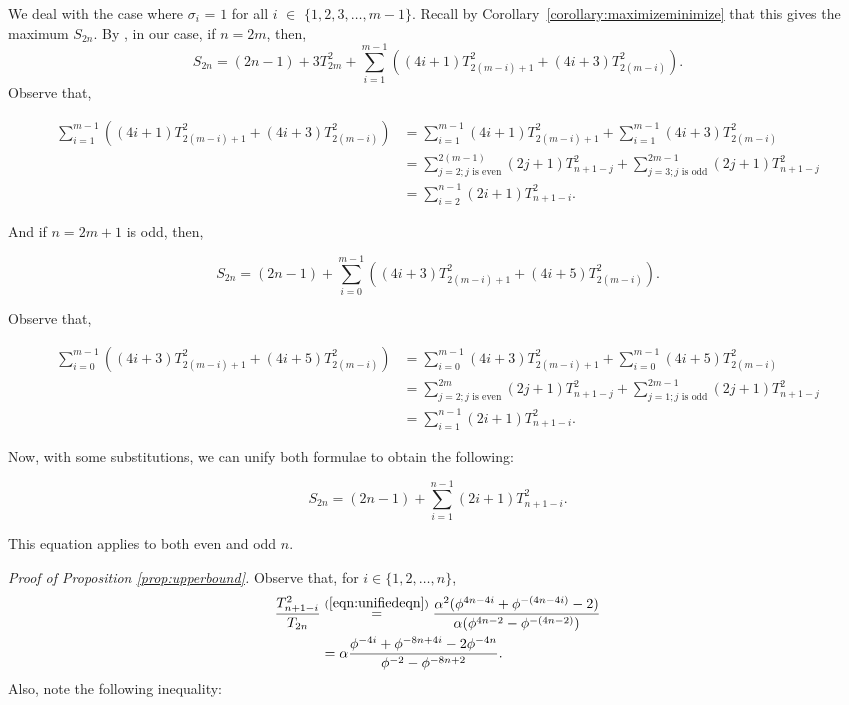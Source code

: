 \documentclass{amsart}
\theoremstyle{definition}
\newcommand{\yandi}[1]{\marginpar{\tiny \color{red} Yandi: #1}}
\begin{document}
We deal with the case where $\sigma_i$ = $1$ for all $i$ $\in$ $\{1, 2, 3, \dots, m - 1\}$. Recall by Corollary~\ref{corollary:maximizeminimize} that this gives the maximum $S_{2n}$. By , in our case, if $n = 2m$, then, \[S_{2n} = (2n-1) + 3T_{2m}^2 +\sum_{i=1}^{m-1}((4i+1)T_{2(m-i)+1}^2+(4i+3)T_{2(m-i)}^2).    
\]
Observe that, 

\begin{align*} \sum_{i=1}^{m-1}((4i+1)T_{2(m-i)+1}^2+(4i+3)T_{2(m-i)}^2) &= \sum_{i = 1}^{m - 1}(4i+1)T_{2(m-i)+1}^2 + \sum_{i = 1}^{m - 1}(4i+3)T_{2(m-i)}^2\\ 
&= \sum_{j = 2; j \text{ is even}}^{2(m - 1)}(2j+1)T_{n+1-j}^2 + \sum_{j = 3; j \text{ is odd}}^{2m - 1}(2j+1)T_{n+1-j}^2 \\
&= \sum_{i = 2}^{n - 1}(2i + 1)T^2_{n + 1 - i}.
\end{align*}

 
And if $n = 2m + 1$ is odd, then, 

\[S_{2n}= (2n-1)+ \sum_{i=0}^{m-1}((4i+3)T_{2(m-i)+1}^2+(4i+5)T_{2(m-i)}^2).\]

Observe that, 

\begin{align*} \sum_{i=0}^{m-1}((4i+3)T_{2(m-i)+1}^2+(4i+5)T_{2(m-i)}^2) &= \sum_{i=0}^{m-1}(4i+3)T_{2(m-i)+1}^2 + \sum_{i=0}^{m-1}(4i+5)T_{2(m-i)}^2\\ 
&= \sum_{j = 2; j \text{ is even}}^{2m}(2j+1)T_{n+1-j}^2 + \sum_{j = 1; j \text{ is odd}}^{2m - 1}(2j+1)T_{n+1-j}^2 \\
&= \sum_{i = 1}^{n - 1}(2i + 1)T^2_{n + 1 - i}.
\end{align*}



Now, with some substitutions, we can unify both formulae to obtain the following: 

\[S_{2n} = (2n - 1) + \sum_{i = 1}^{n - 1} (2i + 1)T_{n + 1 - i}^2.\]

This equation applies to both even and odd $n$.

\noindent \textit{Proof of Proposition \ref{prop:upperbound}.}
    Observe that, for $i \in \{1,2,\dots,n\} $, 
    \begin{equation} \label{eqn:simplifyfrac}
    \begin{aligned}
    \frac{T_{n + 1 - i}^2}{T_{2n}} 
    & \stackrel{(\ref{eqn:unifiedeqn})}{=} \frac{\alpha^2(\phi^{4n - 4i} + \phi^{-(4n - 4i)} - 2)}{\alpha(\phi^{4n - 2} - \phi^{-(4n - 2)})} \\
    & = \alpha \frac{\phi^{-4i} + \phi^{-8n + 4i} - 2\phi^{-4n}}{\phi^{-2} - \phi^{-8n + 2}}.
    \end{aligned}
    \end{equation}
Also, note the following inequality: 
\end{document}
